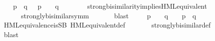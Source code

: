 \begin{isabellebody}
\ \ \isamarkupfalse%
\ {\isacartoucheopen}p\ {\isasymleftrightarrow}\ q\ {\isasymLongrightarrow}\ {\isasymforall}{\isasymphi}{\isachardot}{\kern0pt}\ {\isacharparenleft}{\kern0pt}p\ {\isasymTurnstile}\ {\isasymphi}{\isacharparenright}{\kern0pt}\ {\isacharequal}{\kern0pt}\ {\isacharparenleft}{\kern0pt}q\ {\isasymTurnstile}\ {\isasymphi}{\isacharparenright}{\kern0pt}{\isacartoucheclose}\isanewline
\ \ \ \ \isamarkupfalse%
\ strong{\isacharunderscore}{\kern0pt}bisimilarity{\isacharunderscore}{\kern0pt}implies{\isacharunderscore}{\kern0pt}HML{\isacharunderscore}{\kern0pt}equivalent\ \isanewline
\ \ \ \ \ \ strongly{\isacharunderscore}{\kern0pt}bisimilar{\isacharunderscore}{\kern0pt}symm\ \isanewline
\ \ \ \ \isamarkupfalse%
\ blast\isanewline
{}\isamarkupfalse%
\isanewline
\ \ \isamarkupfalse%
\ {\isacartoucheopen}{\isasymforall}{\isasymphi}{\isachardot}{\kern0pt}\ {\isacharparenleft}{\kern0pt}p\ {\isasymTurnstile}\ {\isasymphi}{\isacharparenright}{\kern0pt}\ {\isacharequal}{\kern0pt}\ {\isacharparenleft}{\kern0pt}q\ {\isasymTurnstile}\ {\isasymphi}{\isacharparenright}{\kern0pt}\ {\isasymLongrightarrow}\ p\ {\isasymleftrightarrow}\ q{\isacartoucheclose}\ \isanewline
\ \ \ \ \isamarkupfalse%
\ HML{\isacharunderscore}{\kern0pt}equivalence{\isacharunderscore}{\kern0pt}is{\isacharunderscore}{\kern0pt}SB\ HML{\isacharunderscore}{\kern0pt}equivalent{\isacharunderscore}{\kern0pt}def\ \isanewline
\ \ \ \ \ \ strongly{\isacharunderscore}{\kern0pt}bisimilar{\isacharunderscore}{\kern0pt}def\ \isanewline
\ \ \ \ \isamarkupfalse%
\ blast\isanewline
{}\isamarkupfalse%
%
\endisatagvisible
{\isafoldvisible}%
%
\isadelimvisible
\isanewline
%
\endisadelimvisible
\isanewline
{}\isamarkupfalse%
\ %
%
\isadelimtheory
%
\endisadelimtheory
%
\isatagtheory
%
\endisatagtheory
{\isafoldtheory}%
%
\isadelimtheory
%
\endisadelimtheory
%
\end{isabellebody}%
\endinput
